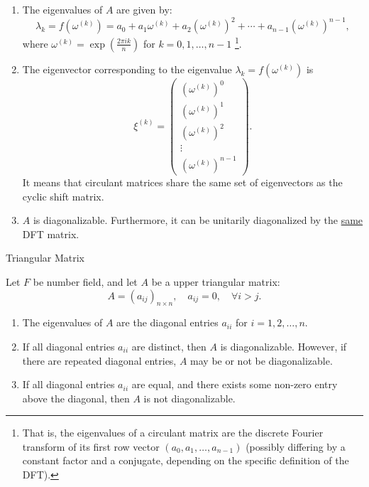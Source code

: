 \documentclass[11pt]{../../TexTemplate/elegantbook} %
\begin{document}
\begin{enumerate}
    \item The eigenvalues of \(A\) are given by:
        \[
        \lambda_{k} = f(\omega^{(k)}) = a_{0} + a_{1}\omega^{(k)} + a_{2}(\omega^{(k)})^{2} + \cdots + a_{n-1}(\omega^{(k)})^{n-1},
        \]
        where \(\omega^{(k)} = \exp\left(\frac{2\pi i k}{n}\right)\) for \(k = 0, 1, \ldots, n-1\)
        \footnote{
            That is, the eigenvalues of a circulant matrix are the discrete Fourier transform of 
            its first row vector \(\left( a_{0}, a_{1}, \ldots, a_{n-1} \right) \) 
            (possibly differing by a constant factor and a conjugate, depending on the specific definition of the DFT).
        }.
    \item The eigenvector corresponding to the eigenvalue 
        \(\lambda_{k} = f(\omega^{(k)})\) is 
        \[
        \xi^{(k)} =
        \begin{pmatrix}
            \left(\omega^{(k)}\right)^{0} \\
            \left(\omega^{(k)}\right)^{1} \\
            \left(\omega^{(k)}\right)^{2} \\
            \vdots \\
            \left(\omega^{(k)}\right)^{n-1}
        \end{pmatrix}.
        \]
        It means that circulant matrices share the same set of eigenvectors as the cyclic shift matrix.
    \item \(A\) is diagonalizable. Furthermore, it can be unitarily diagonalized by the \underline{same} DFT matrix.
\end{enumerate}

\begin{leftbarTitle}{Triangular Matrix}\end{leftbarTitle}
Let \(F\) be number field, and let \(A\) be a upper triangular matrix: 
\[
A =\left( a_{ij} \right) _{n \times n}, \quad a_{ij} = 0, \quad \forall i > j.
\]

\begin{enumerate}
    \item The eigenvalues of \(A\) are the diagonal entries \(a_{ii}\) for \(i = 1, 2, \ldots, n\).
    \item If all diagonal entries \(a_{ii}\) are distinct, then \(A\) is diagonalizable.
        However, if there are repeated diagonal entries, \(A\) may be or not be diagonalizable.
    \item If all diagonal entries \(a_{ii}\) are equal, and there exists some non-zero entry above the diagonal,
        then \(A\) is not diagonalizable.
\end{enumerate}
\end{document}
